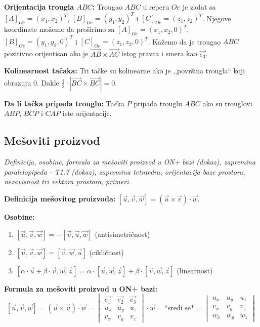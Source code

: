 \documentclass[12pt]{article}
\newcommand{\vek}[1]{\overrightarrow{#1}}
\begin{document}
\textbf{Orijentacija trougla $ABC$:} Trougao $ABC$ u reperu $Oe$ je zadat sa
$[A]_{Oe}=(x_1,x_2)^T$, $[B]_{Oe}=(y_1,y_2)^T$ i $[C]_{Oe}=(z_1,z_2)^T$.
Njegove koordinate možemo da proširimo sa
$[A]_{Oe}=(x_1,x_2,0)^T$, $[B]_{Oe}=(y_1,y_2,0)^T$ i $[C]_{Oe}=(z_1,z_2,0)^T$.
Kažemo da je trougao $ABC$ pozitivno orijentisan ako je
$\vek{AB}\times\vek{AC}$ istog pravca i smera kao $\vek{e_3}$.
\par

\textbf{Kolinearnost tačaka:} Tri tačke su kolinearne ako je ,,površina
trougla`` koji obrazuju $0$. Dakle
$\frac{1}{2}\cdot|\vek{BC}\times\vek{BC}|=0$.
\par

\textbf{Da li tačka pripada trouglu:} Tačka $P$ pripada trouglu $ABC$ ako su
trouglovi $ABP$, $BCP$ i $CAP$ iste orijentacije.

\subsection{Mešoviti proizvod}
\textit{Definicija, osobine, formula za mešoviti proizvod u ON+ bazi (dokaz),
    zapremina paralelopipeda - T1.7 (dokaz), zapremina tetraedra, orijentacija
    baze prostora, nezavisnost tri vektora prostora, primeri.}
\par
\vspace*{1cm}

\textbf{Definicija mešovitog proizvoda:} $[\vek{u},\vek{v},\vek{w}]=
    (\vek{u}\times\vek{v})\cdot\vek{w}$.
\par

\textbf{Osobine:}
\begin{enumerate}[label=\textbf{(\arabic*)}]
    \item $[\vek{u},\vek{v},\vek{w}]=-[\vek{v},\vek{u},\vek{w}]$\hspace*{1cm}
          (antisimetričnost)
    \item $[\vek{u},\vek{v},\vek{w}]=[\vek{v},\vek{w},\vek{u}]$\hspace*{1cm}
          (cikličnost)
    \item $[\alpha\cdot\vek{u}+\beta\cdot\vek{v},\vek{w},\vek{z}]=\alpha\cdot
              [\vek{u},\vek{w},\vek{z}]+\beta\cdot[\vek{v},\vek{w},\vek{z}]$
          \hspace*{1cm}(linearnost)
\end{enumerate}
\par

\textbf{Formula za mešoviti proizvod u ON+ bazi:}
$$[\vek{u},\vek{v},\vek{w}]=(\vek{u}\times\vek{v})\cdot\vek{w}= \begin{vmatrix}
        \vek{e_1} & \vek{e_2} & \vek{e_3} \\
        u_x       & u_y       & u_z       \\
        v_x       & v_y       & v_z
    \end{vmatrix}\cdot\vek{w}=\text{*sredi se*}= \begin{vmatrix}
        u_x & u_y & u_z \\
        v_x & v_y & v_z \\
        w_x & w_y & w_z
    \end{vmatrix}$$
\par
\end{document}
